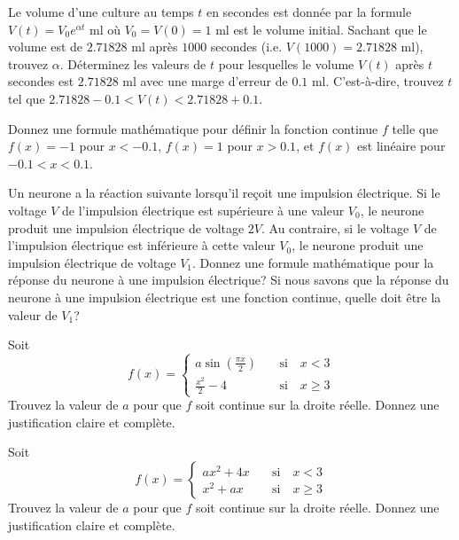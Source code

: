 \begin{question}[\life]
Le volume d'une culture au temps $t$ en secondes est donnée par la
formule $V(t)=V_0 e^{\alpha t}$ ml où $V_0 = V(0) =1$ ml est le
volume initial.  Sachant que le volume est de $2.71828$ ml après
$1000$ secondes (i.e. $V(1000) = 2.71828$ ml), trouvez $\alpha$.
Déterminez les valeurs de $t$ pour lesquelles le volume $V(t)$ après
$t$ secondes est $2.71828$ ml avec une marge d'erreur de $0.1$ ml.
C'est-à-dire, trouvez $t$ tel que
$2.71828 -0.1 < V(t) < 2.71828 +0.1$.
\label{4Q11}
\end{question}

\begin{question}
Donnez une formule mathématique pour définir la fonction continue $f$
telle que $f(x)= -1$ pour $x<-0.1$, $f(x)= 1$ pour $x>0.1$, et $f(x)$
est linéaire pour $-0.1 < x < 0.1$.
\label{4Q12}
\end{question}

\begin{question}[\life]
Un neurone a la réaction suivante lorsqu'il reçoit une impulsion
électrique.  Si le voltage $V$ de l'impulsion électrique est
supérieure à une valeur $V_0$, le neurone produit une impulsion
électrique de voltage $2V$. Au contraire, si le voltage $V$ de
l'impulsion électrique est inférieure à cette valeur $V_0$, le neurone
produit une impulsion électrique de voltage $V_1$.  Donnez une formule
mathématique pour la réponse du neurone à une impulsion électrique?
Si nous savons que la réponse du neurone à une impulsion électrique est
une fonction continue, quelle doit être la valeur de $V_1$?
\label{4Q13}
\end{question}

\begin{question}
Soit
\[
f(x) =
\begin{cases}
\displaystyle a \sin\left(\frac{\pi x}{2}\right) &
\quad \text{si} \quad x < 3 \\
\displaystyle \frac{x^2}{2} - 4 & \quad \text{si} \quad x \geq 3
\end{cases}
\]
Trouvez la valeur de $a$ pour que $f$ soit continue sur la droite
réelle.  Donnez une justification claire et complète.
\label{4Q14}
\end{question}

\begin{question}
Soit
\[
f(x) = \begin{cases}
a x^2 + 4x & \quad \text{si}\quad x < 3 \\
x^2 + a x &  \quad \text{si}\quad x \geq 3
\end{cases}
\]
Trouvez la valeur de $a$ pour que $f$ soit continue sur la droite
réelle.  Donnez une justification claire et complète.
\label{4Q15}
\end{question}

